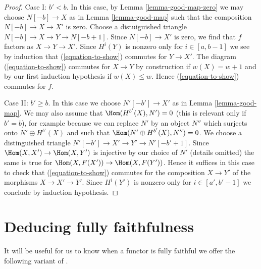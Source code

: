 \begin{proof}
\medskip\noindent
Case I: $b' < b$. In this case, by Lemma \ref{lemma-good-map-zero}
we may choose $N[-b] \to X$ as in Lemma \ref{lemma-good-map}
such that the composition $N[-b] \to X \to X'$ is zero.
Choose a distuiguished triangle $N[-b] \to X \to Y \to N[-b + 1]$. Since
$N[-b] \to X'$ is zero, we find that $f$ factors
as $X \to Y \to X'$. Since $H^i(Y)$ is nonzero only for $i \in [a, b - 1]$
we see by induction that (\ref{equation-to-show}) commutes for
$Y \to X'$. The diagram (\ref{equation-to-show}) commutes for
$X \to Y$ by construction if $w(X) = w + 1$ and by our first
induction hypothesis if $w(X) \leq w$.
Hence (\ref{equation-to-show}) commutes for $f$.

\medskip\noindent
Case II: $b' \geq b$. In this case we choose $N'[-b'] \to X'$
as in Lemma \ref{lemma-good-map}.
We may also assume that $\Hom(H^{b'}(X), N') = 0$ (this is
relevant only if $b' = b$), for example because we can
replace $N'$ by an object $N''$ which surjects onto $N' \oplus H^{b'}(X)$
and such that $\Hom(N' \oplus H^{b'}(X), N'') = 0$.
We choose a distinguished triangle
$N'[-b'] \to X' \to Y' \to N'[-b' + 1]$. Since
$\Hom(X, X') \to \Hom(X, Y')$ is injective by our choice of $N'$
(details omitted) the same is true for
$\Hom(X, F(X')) \to \Hom(X, F(Y'))$.
Hence it suffices in this case to check that
(\ref{equation-to-show}) commutes for the composition $X \to Y'$
of the morphisms $X \to X' \to Y'$.
Since $H^i(Y')$ is nonzero only for $i \in [a', b' - 1]$
we conclude by induction hypothesis.
\end{proof}










\section{Deducing fully faithfulness}
\label{section-get-fully-faithful}

\noindent
It will be useful for us to know when a functor is fully faithful
we offer the following variant of \cite[Lemma 2.15]{Orlov-K3}.

